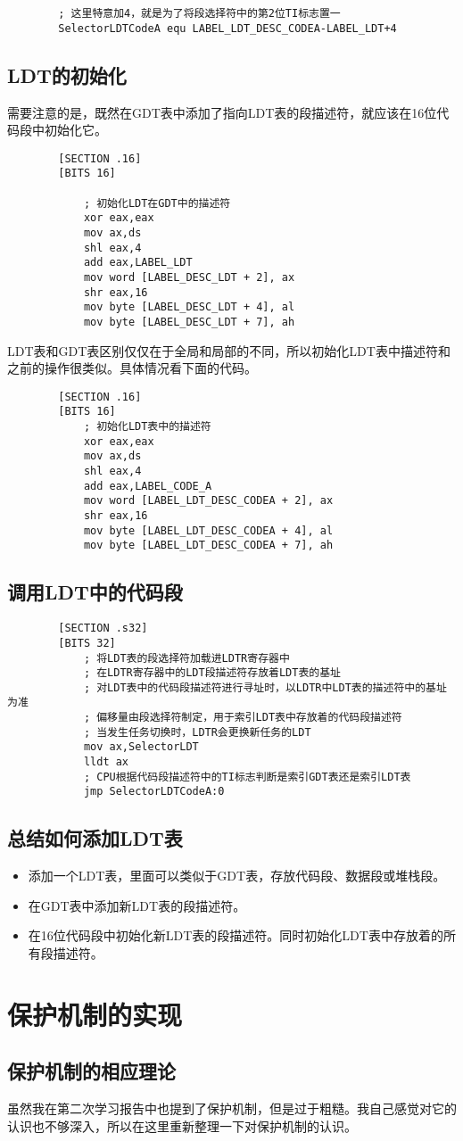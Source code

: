 \documentclass[a4paper,left=2.5cm,right=2.5cm,11pt]{article}
\begin{document}
	\begin{lstlisting}
		; 这里特意加4，就是为了将段选择符中的第2位TI标志置一
		SelectorLDTCodeA equ LABEL_LDT_DESC_CODEA-LABEL_LDT+4
	\end{lstlisting}
\subsection{LDT的初始化}
	需要注意的是，既然在GDT表中添加了指向LDT表的段描述符，就应该在16位代码段中初始化它。
	\begin{lstlisting}
		[SECTION .16]
		[BITS 16]
			
			; 初始化LDT在GDT中的描述符
			xor eax,eax
			mov ax,ds
			shl eax,4
			add eax,LABEL_LDT
			mov word [LABEL_DESC_LDT + 2], ax
			shr eax,16
			mov byte [LABEL_DESC_LDT + 4], al
			mov byte [LABEL_DESC_LDT + 7], ah
	\end{lstlisting}
	
	LDT表和GDT表区别仅仅在于全局和局部的不同，所以初始化LDT表中描述符和之前的操作很类似。具体情况看下面的代码。
	\begin{lstlisting}
		[SECTION .16]
		[BITS 16]
			; 初始化LDT表中的描述符
			xor eax,eax
			mov ax,ds
			shl eax,4
			add eax,LABEL_CODE_A
			mov word [LABEL_LDT_DESC_CODEA + 2], ax
			shr eax,16
			mov byte [LABEL_LDT_DESC_CODEA + 4], al
			mov byte [LABEL_LDT_DESC_CODEA + 7], ah
	\end{lstlisting}
\subsection{调用LDT中的代码段}
	\begin{lstlisting}
		[SECTION .s32]
		[BITS 32]
			; 将LDT表的段选择符加载进LDTR寄存器中
			; 在LDTR寄存器中的LDT段描述符存放着LDT表的基址
			; 对LDT表中的代码段描述符进行寻址时，以LDTR中LDT表的描述符中的基址为准
			; 偏移量由段选择符制定，用于索引LDT表中存放着的代码段描述符
			; 当发生任务切换时，LDTR会更换新任务的LDT
			mov ax,SelectorLDT
			lldt ax
			; CPU根据代码段描述符中的TI标志判断是索引GDT表还是索引LDT表
			jmp SelectorLDTCodeA:0
	\end{lstlisting}
\subsection{总结如何添加LDT表}
	\begin{itemize}
		\item 添加一个LDT表，里面可以类似于GDT表，存放代码段、数据段或堆栈段。
		\item 在GDT表中添加新LDT表的段描述符。
		\item 在16位代码段中初始化新LDT表的段描述符。同时初始化LDT表中存放着的所有段描述符。
	\end{itemize}

\clearpage

\section{保护机制的实现}
\subsection{保护机制的相应理论}
	虽然我在第二次学习报告中也提到了保护机制，但是过于粗糙。我自己感觉对它的认识也不够深入，所以在这里重新整理一下对保护机制的认识。\par
\end{document}
